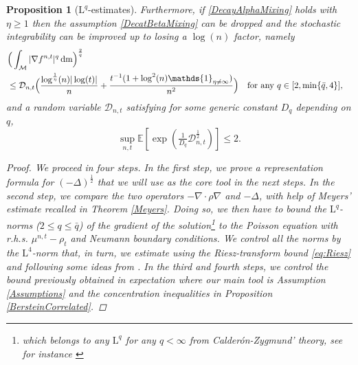 \documentclass[11pt,a4paper,oneside]{amsart}
\numberwithin{equation}{section}
\newtheorem{proposition}[theorem]{Proposition}
\newcommand{\dd}{\mathrm{d}}
\newcommand{\LL}{\mathrm{L}}
\newcommand{\m}{\mathrm{m}}
\begin{document}
\begin{proposition}[$\LL^{q}$-estimates]
Furthermore, if \eqref{DecayAlphaMixing} holds with $\eta\geq 1$ then the assumption \eqref{DecatBetaMixing} can be dropped and the stochastic integrability can be improved up to losing a $\log(n)$ factor, namely
%
\begin{equation}\label{Eq22}
\begin{split}
\lefteqn{\Big(\int_\mathcal{M} \vert\nabla f^{n,t}\vert^{q}\,\dd\m\Big)^\frac{2}{q}}\\ &\leq \mathcal{D}_{n,t}\Big(\frac{\log^{\frac
{1}{\eta}}(n)\vert\log(t)\vert}{n}+\frac{t^{-1}(1+\log^2(n)\mathds{1}_{\eta\neq \infty})}{n^2}\Big)\quad \text{for any $q\in [2,\min\{\bar q,4\}]$},
\end{split}
\end{equation}
%
and a random variable $\mathcal{D}_{n,t}$ satisfying for some generic constant $D_q$ depending on $q$,
%
$$\sup_{n,t}\mathbb{E}[\exp(\tfrac{1}{D_{q}}\mathcal{D}^{\frac{1}{2}}_{n,t})]\leq 2.$$
%
\begin{proof}
%
We proceed in four steps. In the first step, we prove a representation formula for $(-\Delta)^{\frac{1}{2}}$ that we will use as the core tool in the next steps. In the second step, we compare the two operators $-\nabla\cdot \rho\nabla$ and $-\Delta$, with help of Meyers' estimate recalled in Theorem \ref{Meyers}. Doing so, we then have to bound the $\LL^{q}$-norms ($2\leq q\leq\bar q$) of the gradient of the solution\footnote{which belongs to any $\LL^{q}$ for any $q<\infty$ from Calder\'on-Zygmund' theory, see for instance \cite{giaquinta2013introduction}} to the Poisson equation with r.h.s. $\mu^{n,t}-\rho_t$ and Neumann boundary conditions. We control all the norms by the $\LL^{4}$-norm that, in turn, we estimate using the Riesz-transform bound \eqref{eq:Riesz} and following some ideas from \cite[Lemma 3.17]{ambrosio2019pde}. In the third and fourth steps, we control the bound previously obtained in expectation where our main tool is Assumption \ref{Assumptions} and the concentration inequalities in Proposition \ref{BersteinCorrelated}.

%
\medskip
%


\end{proof}
\end{proposition}
\end{document}
